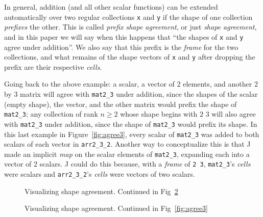 In general, addition (and all other scalar functions) can be extended automatically over two regular collections \texttt{x} and \texttt{y}  
if the shape of one collection \textit{prefixes} the other.
This is called \textit{prefix shape agreement}, or just \textit{shape agreement}, 
and in this paper we will say when this happens that ``the shapes of \texttt{x} and \texttt{y} agree under addition''\cite{rankanduni}.
We also say that this prefix is the \textit{frame} for the two collections,
and what remains of the shape vectors of \texttt{x} and \texttt{y} after dropping the prefix are their respective \textit{cells}.

Going back to the above example: 
a scalar, a vector of 2 elements, and another 2 by 3 matrix will agree with \texttt{mat2\_3} under addition, 
since the shapes of the scalar (empty shape), the vector, and the other matrix would prefix the shape of \texttt{mat2\_3}; 
any collection of rank $n \ge 2$ whose shape begins with $2$ $3$ will also agree with 
\texttt{mat2\_3} under addition, since the shape of \texttt{mat2\_3} would prefix its shape.
In this last example in Figure~\ref{fig:agree3}, 
every scalar of \texttt{mat2\_3} was added to both scalars of each vector in \texttt{arr2\_3\_2}. 
Another way to conceptualize this is that J made an implicit \textit{map} on the scalar elements of \texttt{mat2\_3}, 
expanding each into a vector of 2 scalars.
J could do this because, with a \textit{frame} of \texttt{2 3}, \texttt{mat2\_3}'s \textit{cells} were scalars and 
\texttt{arr2\_3\_2}'s \textit{cells} were vectors of two scalars.


\begin{figure}[htbp]\ContinuedFloat*
\begin{quote}
\begin{singlespacing}
\begin{small}
\end{small}
\end{singlespacing}
\end{quote}
\caption{Visualizing shape agreement. Continued in Fig~\ref{fig:agree2}}
\label{fig:agree1}
\end{figure}

\begin{figure}[htbp]\ContinuedFloat
\begin{quote}
\begin{singlespacing}
\begin{small}
\end{small}
\end{singlespacing}
\end{quote}
\caption{Visualizing shape agreement. Continued in Fig~\ref{fig:agree3}}
\label{fig:agree2}
\end{figure}


